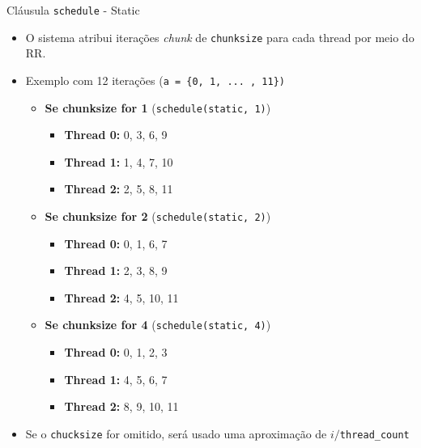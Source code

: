 	
	\begin{frame}{Cláusula {\tt schedule} - Static}
		\begin{itemize}
			\item O sistema atribui iterações \textit{chunk} de {\tt chunksize} para cada thread por meio do RR.
			\item Exemplo com 12 iterações ({\tt a = \{0, 1, ... , 11\})}
			\begin{itemize}
				\item \textbf{Se chunksize for 1} ({\tt schedule(static, 1)})
				\begin{itemize}
					\item \textbf{Thread 0:} 0, 3, 6, 9
					\item \textbf{Thread 1:} 1, 4, 7, 10
					\item \textbf{Thread 2:} 2, 5, 8, 11
				\end{itemize}
				\item \textbf{Se chunksize for 2} ({\tt schedule(static, 2)})
				\begin{itemize}
					\item \textbf{Thread 0:} 0, 1, 6, 7
					\item \textbf{Thread 1:} 2, 3, 8, 9
					\item \textbf{Thread 2:} 4, 5, 10, 11
				\end{itemize}
				\item \textbf{Se chunksize for 4} ({\tt schedule(static, 4)})
				\begin{itemize}
					\item \textbf{Thread 0:} 0, 1, 2, 3
					\item \textbf{Thread 1:} 4, 5, 6, 7
					\item \textbf{Thread 2:} 8, 9, 10, 11
				\end{itemize}
			\end{itemize}
			\item Se o {\tt chucksize} for omitido, será usado uma aproximação de $i/${\tt thread\_count}
		\end{itemize}
	\end{frame}


